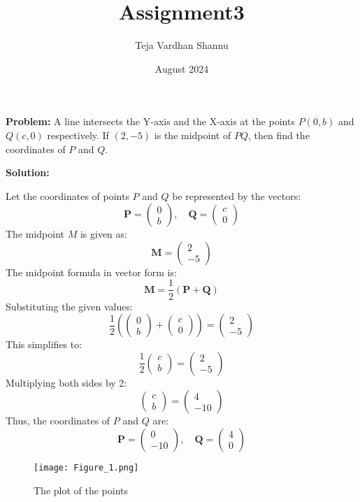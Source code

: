 \documentclass[journal]{IEEEtran}
\title{Assignment3}
\author{Teja Vardhan Shannu}
\date{August 2024}
\numberwithin{equation}{enumi}
\numberwithin{figure}{enumi}
\begin{document}
\maketitle
\textbf{Problem:} A line intersects the Y-axis and the X-axis at the points $P(0,b)$ and $Q(c,0)$ respectively. If $(2,-5)$ is the midpoint of $PQ$, then find the coordinates of $P$ and $Q$.

\textbf{Solution:}

Let the coordinates of points $P$ and $Q$ be represented by the vectors:
\[
\mathbf{P} = \begin{pmatrix} 0 \\ b \end{pmatrix}, \quad \mathbf{Q} = \begin{pmatrix} c \\ 0 \end{pmatrix}
\]
The midpoint $M$ is given as:
\[
\mathbf{M} = \begin{pmatrix} 2 \\ -5 \end{pmatrix}
\]
The midpoint formula in vector form is:
\[
\mathbf{M} = \frac{1}{2} (\mathbf{P} + \mathbf{Q})
\]
Substituting the given values:
\[
\frac{1}{2} \left(\begin{pmatrix} 0 \\ b \end{pmatrix} + \begin{pmatrix} c \\ 0 \end{pmatrix}\right) = \begin{pmatrix} 2 \\ -5 \end{pmatrix}
\]
This simplifies to:
\[
\frac{1}{2} \begin{pmatrix} c \\ b \end{pmatrix} = \begin{pmatrix} 2 \\ -5 \end{pmatrix}
\]
Multiplying both sides by 2:
\[
\begin{pmatrix} c \\ b \end{pmatrix} = \begin{pmatrix} 4 \\ -10 \end{pmatrix}
\]
Thus, the coordinates of $P$ and $Q$ are:
\[
\mathbf{P} = \begin{pmatrix} 0 \\ -10 \end{pmatrix}, \quad \mathbf{Q} = \begin{pmatrix} 4 \\ 0 \end{pmatrix}
\]

\begin{figure}[ht!]
  \hspace{-3cm}
  \texttt{[image: Figure\_1.png]}
  
  \caption{The plot of the points }
  \label{fig:your_label}
\end{figure}
\end{document}
